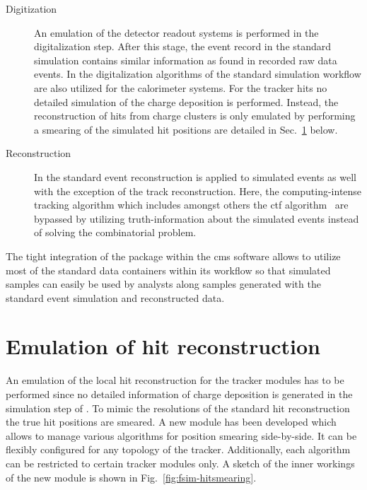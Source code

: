 \begin{description}
\item[Digitization] An emulation of the detector readout systems is performed in the digitalization step. After this stage, the event record in the standard simulation contains similar information as found in recorded raw data events. In \FSIM the digitalization algorithms of the standard simulation workflow are also utilized for the calorimeter systems. For the tracker hits no detailed simulation of the charge deposition is performed. Instead, the reconstruction of hits from charge clusters is only emulated by performing a smearing of the simulated hit positions are detailed in Sec.~\ref{sec:fsim-hits} below.

\item[Reconstruction] In \FSIM the standard event reconstruction is applied to simulated events as well with the exception of the track reconstruction. Here, the computing-intense tracking algorithm which includes amongst others the \acrfull{ctf} algorithm~\cite{Chatrchyan:2014fea} are bypassed by utilizing truth-information about the simulated events instead of solving the combinatorial problem.
\end{description}

The tight integration of the \FSIM package within the \gls{cms} software allows to utilize most of the standard data containers within its workflow so that simulated \FSIM samples can easily be used by analysts along samples generated with the standard event simulation and reconstructed data. 


\section{Emulation of hit reconstruction}
\label{sec:fsim-hits}

An emulation of the local hit reconstruction for the tracker modules has to be performed since no detailed information of charge deposition is generated in the simulation step of \FSIM. To mimic the resolutions of the standard hit reconstruction the true hit positions are smeared. A new \FSIM module has been developed which allows to manage various algorithms for position smearing side-by-side. It can be flexibly configured for any topology of the tracker. Additionally, each algorithm can be restricted to certain tracker modules only. A sketch of the inner workings of the new module is shown in Fig.~\ref{fig:fsim-hitsmearing}.

